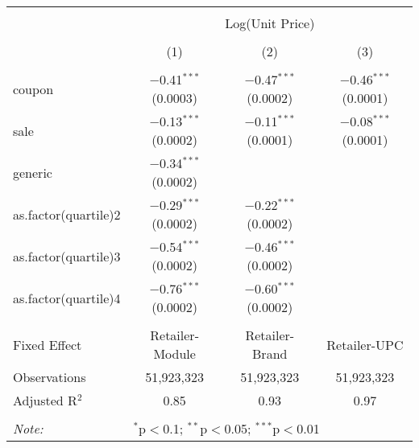 
\begin{table}[!htbp] \centering 
  \caption{} 
  \label{tab:overallSavings} 
\begin{tabular}{@{\extracolsep{5pt}}lccc} 
\\[-1.8ex]\hline 
\hline \\[-1.8ex] 
 & \multicolumn{3}{c}{Log(Unit Price)} \\ 
\\[-1.8ex] & (1) & (2) & (3)\\ 
\hline \\[-1.8ex] 
 coupon & $-$0.41$^{***}$ (0.0003) & $-$0.47$^{***}$ (0.0002) & $-$0.46$^{***}$ (0.0001) \\ 
  sale & $-$0.13$^{***}$ (0.0002) & $-$0.11$^{***}$ (0.0001) & $-$0.08$^{***}$ (0.0001) \\ 
  generic & $-$0.34$^{***}$ (0.0002) &  &  \\ 
  as.factor(quartile)2 & $-$0.29$^{***}$ (0.0002) & $-$0.22$^{***}$ (0.0002) &  \\ 
  as.factor(quartile)3 & $-$0.54$^{***}$ (0.0002) & $-$0.46$^{***}$ (0.0002) &  \\ 
  as.factor(quartile)4 & $-$0.76$^{***}$ (0.0002) & $-$0.60$^{***}$ (0.0002) &  \\ 
 \hline \\[-1.8ex] 
Fixed Effect & Retailer-Module & Retailer-Brand & Retailer-UPC \\ 
Observations & 51,923,323 & 51,923,323 & 51,923,323 \\ 
Adjusted R$^{2}$ & 0.85 & 0.93 & 0.97 \\ 
\hline 
\hline \\[-1.8ex] 
\textit{Note:}  & \multicolumn{3}{l}{$^{*}$p$<$0.1; $^{**}$p$<$0.05; $^{***}$p$<$0.01} \\ 
\end{tabular} 
\end{table} 
